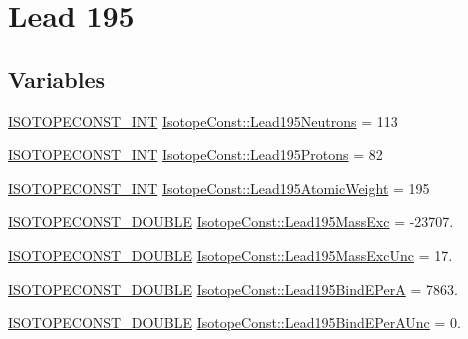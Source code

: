 \hypertarget{group___isotope_const-_lead-_pb195}{}\section{Lead 195}
\label{group___isotope_const-_lead-_pb195}
\subsection*{Variables}
\begin{DoxyCompactItemize}
\item 
\mbox{\hyperlink{group___isotope_const-_macros_ga5f18360b3e99483a35c32d789e62621c}{I\+S\+O\+T\+O\+P\+E\+C\+O\+N\+S\+T\+\_\+\+I\+NT}} \mbox{\hyperlink{group___isotope_const-_lead-_pb195_ga416158c5465c32512bf867e02c05ca1d}{Isotope\+Const\+::\+Lead195\+Neutrons}} = 113
\item 
\mbox{\hyperlink{group___isotope_const-_macros_ga5f18360b3e99483a35c32d789e62621c}{I\+S\+O\+T\+O\+P\+E\+C\+O\+N\+S\+T\+\_\+\+I\+NT}} \mbox{\hyperlink{group___isotope_const-_lead-_pb195_ga0b19076829b407ac0d58b04eed3eb246}{Isotope\+Const\+::\+Lead195\+Protons}} = 82
\item 
\mbox{\hyperlink{group___isotope_const-_macros_ga5f18360b3e99483a35c32d789e62621c}{I\+S\+O\+T\+O\+P\+E\+C\+O\+N\+S\+T\+\_\+\+I\+NT}} \mbox{\hyperlink{group___isotope_const-_lead-_pb195_ga634fa5232718b6acd59726affbbf0912}{Isotope\+Const\+::\+Lead195\+Atomic\+Weight}} = 195
\item 
\mbox{\hyperlink{group___isotope_const-_macros_ga8f45a7272ce02c0b4c65c44636ed719a}{I\+S\+O\+T\+O\+P\+E\+C\+O\+N\+S\+T\+\_\+\+D\+O\+U\+B\+LE}} \mbox{\hyperlink{group___isotope_const-_lead-_pb195_gaa5424c8efa7c5a60297fbab978f2734a}{Isotope\+Const\+::\+Lead195\+Mass\+Exc}} = -\/23707.
\item 
\mbox{\hyperlink{group___isotope_const-_macros_ga8f45a7272ce02c0b4c65c44636ed719a}{I\+S\+O\+T\+O\+P\+E\+C\+O\+N\+S\+T\+\_\+\+D\+O\+U\+B\+LE}} \mbox{\hyperlink{group___isotope_const-_lead-_pb195_ga60bfe753e52a847766220f37cc70f4f4}{Isotope\+Const\+::\+Lead195\+Mass\+Exc\+Unc}} = 17.
\item 
\mbox{\hyperlink{group___isotope_const-_macros_ga8f45a7272ce02c0b4c65c44636ed719a}{I\+S\+O\+T\+O\+P\+E\+C\+O\+N\+S\+T\+\_\+\+D\+O\+U\+B\+LE}} \mbox{\hyperlink{group___isotope_const-_lead-_pb195_gabffd27fb156fa39f208c9a9bc2508884}{Isotope\+Const\+::\+Lead195\+Bind\+E\+PerA}} = 7863.
\item 
\mbox{\hyperlink{group___isotope_const-_macros_ga8f45a7272ce02c0b4c65c44636ed719a}{I\+S\+O\+T\+O\+P\+E\+C\+O\+N\+S\+T\+\_\+\+D\+O\+U\+B\+LE}} \mbox{\hyperlink{group___isotope_const-_lead-_pb195_gad4bc3276d0b6f9aa71a947d1cf885946}{Isotope\+Const\+::\+Lead195\+Bind\+E\+Per\+A\+Unc}} = 0.

\end{DoxyCompactItemize}
